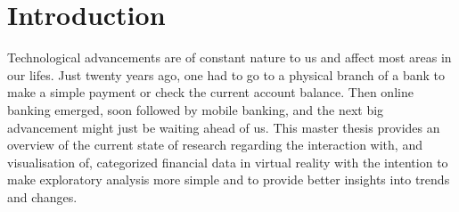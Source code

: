 
\chapter{Introduction} %

\label{ChapterIntroduction}

Technological advancements are of constant nature to us and affect most areas in our lifes. Just twenty years ago, one had to go to a physical branch of a bank to make a simple payment or check the current account balance. Then online banking emerged, soon followed by mobile banking, and the next big advancement might just be waiting ahead of us. This master thesis provides an overview of the current state of research regarding the interaction with, and visualisation of, categorized financial data in virtual reality with the intention to make exploratory analysis more simple and to provide better insights into trends and changes.

